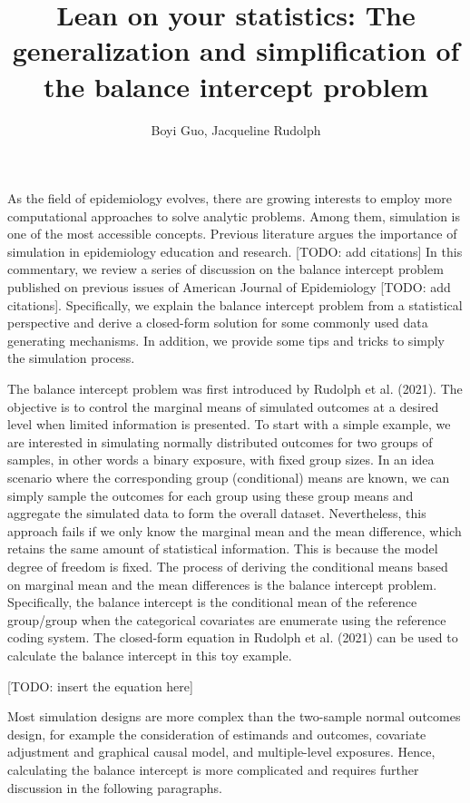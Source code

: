 \documentclass[
]{article}
\title{Lean on your statistics: The generalization and simplification of
the balance intercept problem}
\author{Boyi Guo, Jacqueline Rudolph}
\date{}
\begin{document}
\maketitle

As the field of epidemiology evolves, there are growing interests to
employ more computational approaches to solve analytic problems. Among
them, simulation is one of the most accessible concepts. Previous
literature argues the importance of simulation in epidemiology education
and research. {[}TODO: add citations{]} In this commentary, we review a
series of discussion on the balance intercept problem published on
previous issues of American Journal of Epidemiology {[}TODO: add
citations{]}. Specifically, we explain the balance intercept problem
from a statistical perspective and derive a closed-form solution for
some commonly used data generating mechanisms. In addition, we provide
some tips and tricks to simply the simulation process.

The balance intercept problem was first introduced by Rudolph et al.
(2021). The objective is to control the marginal means of simulated
outcomes at a desired level when limited information is presented. To
start with a simple example, we are interested in simulating normally
distributed outcomes for two groups of samples, in other words a binary
exposure, with fixed group sizes. In an idea scenario where the
corresponding group (conditional) means are known, we can simply sample
the outcomes for each group using these group means and aggregate the
simulated data to form the overall dataset. Nevertheless, this approach
fails if we only know the marginal mean and the mean difference, which
retains the same amount of statistical information. This is because the
model degree of freedom is fixed. The process of deriving the
conditional means based on marginal mean and the mean differences is the
balance intercept problem. Specifically, the balance intercept is the
conditional mean of the reference group/group when the categorical
covariates are enumerate using the reference coding system. The
closed-form equation in Rudolph et al. (2021) can be used to calculate
the balance intercept in this toy example.

{[}TODO: insert the equation here{]}

Most simulation designs are more complex than the two-sample normal
outcomes design, for example the consideration of estimands and
outcomes, covariate adjustment and graphical causal model, and
multiple-level exposures. Hence, calculating the balance intercept is
more complicated and requires further discussion in the following
paragraphs.
\end{document}
